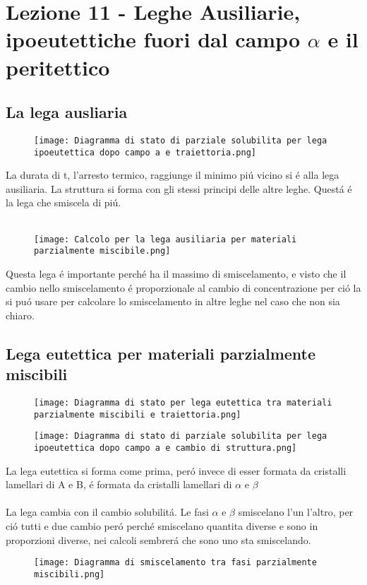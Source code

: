 \documentclass{article}
\begin{document}
{    \section{Lezione 11 - Leghe Ausiliarie, ipoeutettiche fuori dal campo $\alpha$ e il peritettico}
        \subsection{La lega ausliaria}
            \begin{figure}[h!]
                \centering
                \texttt{[image: Diagramma di stato di parziale solubilita per lega ipoeutettica dopo campo a e traiettoria.png]}
            \end{figure}
            La durata di t, l'arresto termico, raggiunge il minimo pi\'u vicino si \'e alla lega ausiliaria. La struttura si forma con gli stessi principi delle altre leghe. Quest\'a \'e la lega che smiscela di pi\'u.\\ \\
            \begin{figure}[h!]
                \centering
                \texttt{[image: Calcolo per la lega ausiliaria per materiali parzialmente miscibile.png]}
            \end{figure}
            Questa lega \'e importante perch\'e ha il massimo di smiscelamento, e visto che il cambio nello smiscelamento \'e proporzionale al cambio di concentrazione per ci\'o la si pu\'o usare per calcolare lo smiscelamento in altre leghe nel caso che non sia chiaro.
        \subsection{Lega eutettica per materiali parzialmente miscibili}
            \begin{figure}[h!]
                \centering
                \texttt{[image: Diagramma di stato per lega eutettica tra materiali parzialmente miscibili e traiettoria.png]}
            \end{figure}
            \begin{figure}[h!]
                \centering
                \texttt{[image: Diagramma di stato di parziale solubilita per lega ipoeutettica dopo campo a e cambio di struttura.png]}
            \end{figure}
            La lega eutettica si forma come prima, per\'o invece di esser formata da cristalli lamellari di A e B, \'e formata da cristalli lamellari di $\alpha$ e $\beta$ \\ \\
            La lega cambia con il cambio solubilit\'a. Le fasi $\alpha$ e $\beta$ smiscelano l'un l'altro, per ci\'o tutti e due cambio per\'o perch\'e smiscelano quantita diverse e sono in proporzioni diverse, nei calcoli sembrer\'a che sono uno sta smiscelando.
            \begin{figure}[h!]
                \centering
                \texttt{[image: Diagramma di smiscelamento tra fasi parzialmente miscibili.png]}
            \end{figure}
}
\end{document}
